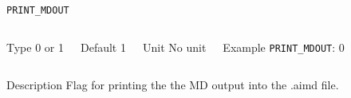 \documentclass[xcolor=dvipsnames,t]{beamer}
\begin{document}
\begin{frame}[allowframebreaks]{\texttt{PRINT\_MDOUT}} \label{PRINT_MDOUT}
\vspace*{-12pt}
\begin{columns}
\begin{block}{Type}
0 or 1
\end{block}

\begin{block}{Default}
1
\end{block}

\begin{block}{Unit}
No unit
\end{block}

\begin{block}{Example}
\texttt{PRINT\_MDOUT}: 0
\end{block}
\end{columns}

\begin{block}{Description}
Flag for printing the the MD output into the .aimd file. 
\end{block}


\end{frame}
\end{document}
